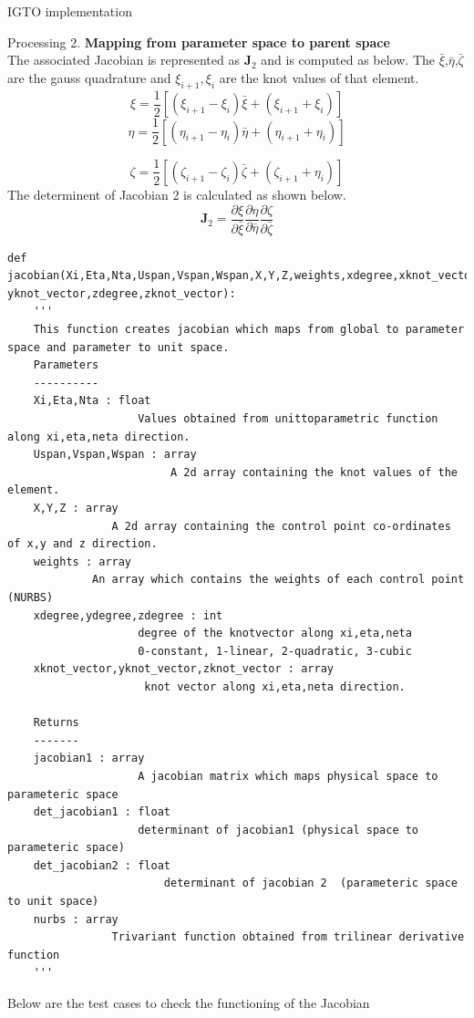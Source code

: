 \documentclass[a4paper,12pt,times]{article}
\begin{document}
\begin{section}{IGTO implementation}
\begin{subsection}{Processing}
2. \textbf{ Mapping from parameter space to parent space}
\\ The associated Jacobian is represented as $\mathbf{J}_{2}$ and is computed as below. The $\bar{\xi}$,$\bar{\eta}$,$\bar{\zeta}$ are the gauss quadrature and $\xi_{i+1},\xi_{i}$  are the knot values of that element.
\begin{equation}
\xi=\frac{1}{2}\left[\left(\xi_{i+1}-\xi_{i}\right) \bar{\xi}+\left(\xi_{i+1}+\xi_{i}\right)\right]
\end{equation}
\begin{equation}
\eta=\frac{1}{2}\left[\left(\eta_{i+1}-\eta_{i}\right) \bar{\eta}+\left(\eta_{i+1}+\eta_{i}\right)\right]
\end{equation}

\begin{equation}
\zeta=\frac{1}{2}\left[\left(\zeta_{i+1}-\zeta_{i}\right) \bar{\zeta}+\left(\zeta_{i+1}+\eta_{i}\right)\right]
\end{equation}
The determinent of Jacobian 2 is calculated as shown below.
\begin{equation}\label{J2}
\mathbf{J}_{2}=\frac{\partial \xi}{\partial \bar{\xi}} \frac{\partial \eta}{\partial \bar{\eta}} \frac{\partial \zeta}{\partial \bar{\zeta}}
\end{equation}

\begin{lstlisting}
def jacobian(Xi,Eta,Nta,Uspan,Vspan,Wspan,X,Y,Z,weights,xdegree,xknot_vector,ydegree,
yknot_vector,zdegree,zknot_vector):
    '''
    This function creates jacobian which maps from global to parameter space and parameter to unit space.
    Parameters
    ----------
    Xi,Eta,Nta : float
                    Values obtained from unittoparametric function along xi,eta,neta direction. 
    Uspan,Vspan,Wspan : array
                         A 2d array containing the knot values of the element.
    X,Y,Z : array
                A 2d array containing the control point co-ordinates of x,y and z direction.
    weights : array
             An array which contains the weights of each control point (NURBS)
    xdegree,ydegree,zdegree : int
                    degree of the knotvector along xi,eta,neta
                    0-constant, 1-linear, 2-quadratic, 3-cubic 
    xknot_vector,yknot_vector,zknot_vector : array
                     knot vector along xi,eta,neta direction.

    Returns
    -------
    jacobian1 : array
                    A jacobian matrix which maps physical space to parameteric space
    det_jacobian1 : float
                    determinant of jacobian1 (physical space to parameteric space)
    det_jacobian2 : float   
                        determinant of jacobian 2  (parameteric space to unit space)    
    nurbs : array
                Trivariant function obtained from trilinear derivative function               
    '''
\end{lstlisting}
Below are the test cases to check the functioning of the Jacobian
\begin{lstlisting}


\end{lstlisting}
\end{subsection}
\end{section}
\end{document}
